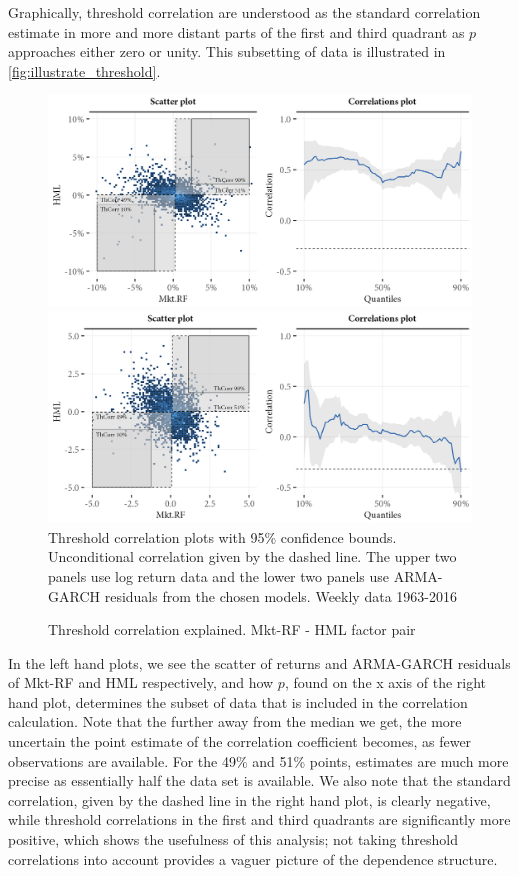 Graphically, threshold correlation are understood as the standard correlation estimate in more and more distant parts of the first and third quadrant as $p$ approaches either zero or unity. This subsetting of data is illustrated in \autoref{fig:illustrate_threshold}. 

\begin{figure}[H]
  \caption{Threshold correlation explained. Mkt-RF - HML factor pair}
  \label{fig:illustrate_threshold}
  \centering
  \begin{minipage}{\textwidth}
  \includegraphics[scale=1]{graphics/threshold_explain_ret.png}  
  \includegraphics[scale=1]{graphics/threshold_explain_res.png}  
  \vspace{3mm}
  \footnotesize
  Threshold correlation plots with 95\% confidence bounds. Unconditional correlation given by the dashed line. The upper two panels use log return data and the lower two panels use ARMA-GARCH residuals from the chosen models. Weekly data 1963-2016
  \end{minipage}
\end{figure}

In the left hand plots, we see the scatter of returns and ARMA-GARCH residuals of Mkt-RF and HML respectively, and how $p$, found on the x axis of the right hand plot, determines the subset of data that is included in the correlation calculation. Note that the further away from the median we get, the more uncertain the point estimate of the correlation coefficient becomes, as fewer observations are available. For the 49\% and 51\% points, estimates are much more precise as essentially half the data set is available. We also note that the standard correlation, given by the dashed line in the right hand plot, is clearly negative, while threshold correlations in the first and third quadrants are significantly more positive, which shows the usefulness of this analysis; not taking threshold correlations into account provides a vaguer picture of the dependence structure.

